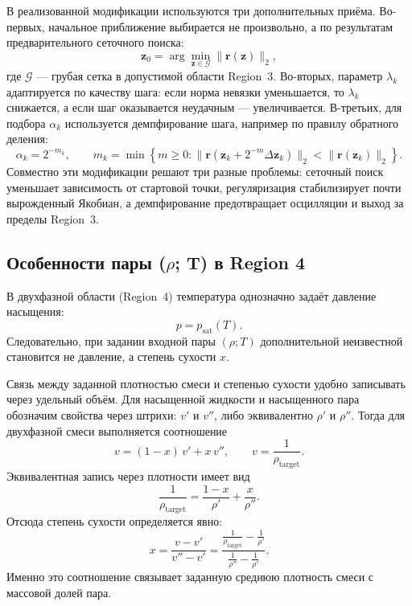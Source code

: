 В реализованной модификации используются три дополнительных приёма.
Во-первых, начальное приближение выбирается
не произвольно,
а по результатам предварительного сеточного поиска:
\begin{equation}
\mathbf{z}_{0} = \arg\min_{\mathbf{z}\in\mathcal{G}}
\|\mathbf{r}(\mathbf{z})\|_{2},
\end{equation}
где $\mathcal{G}$ --- грубая сетка в допустимой области Region~3.
Во-вторых, параметр $\lambda_{k}$ адаптируется по качеству шага:
если норма невязки уменьшается,
то $\lambda_{k}$ снижается,
а если шаг оказывается неудачным ---
увеличивается.
В-третьих, для подбора $\alpha_{k}$
используется демпфирование шага,
например по правилу обратного деления:
\begin{equation}
\alpha_{k} = 2^{-m_{k}},
\qquad
m_{k} = \min\left\{
m \ge 0 :
\|\mathbf{r}(\mathbf{z}_{k} + 2^{-m}\Delta \mathbf{z}_{k})\|_{2}
<
\|\mathbf{r}(\mathbf{z}_{k})\|_{2}
\right\}.
\end{equation}
Совместно эти модификации решают три разные проблемы:
сеточный поиск уменьшает зависимость от стартовой точки,
регуляризация стабилизирует почти вырожденный Якобиан,
а демпфирование предотвращает осцилляции и выход за пределы Region~3.

\subsection{Особенности пары (\texorpdfstring{$\rho$}{rho}; T) в Region 4}

В двухфазной области (Region~4)
температура однозначно задаёт давление насыщения:
\begin{equation}
p = p_{\mathrm{sat}}(T).
\end{equation}
Следовательно, при задании входной пары $(\rho; T)$
дополнительной неизвестной становится не давление,
а степень сухости $x$.

Связь между заданной плотностью смеси
и степенью сухости удобно записывать
через удельный объём.
Для насыщенной жидкости и насыщенного пара
обозначим свойства через штрихи:
$v'$ и $v''$, либо эквивалентно $\rho'$ и $\rho''$.
Тогда для двухфазной смеси выполняется соотношение
\begin{equation}
v = (1-x)\,v' + x\,v'',
\qquad
v = \frac{1}{\rho_{\mathrm{target}}}.
\end{equation}
Эквивалентная запись через плотности имеет вид
\begin{equation}
\frac{1}{\rho_{\mathrm{target}}}
=
\frac{1-x}{\rho'}
+
\frac{x}{\rho''}.
\end{equation}
Отсюда степень сухости определяется явно:
\begin{equation}
x = \frac{v - v'}{v'' - v'}
=
\frac{\frac{1}{\rho_{\mathrm{target}}} - \frac{1}{\rho'}}
{\frac{1}{\rho''} - \frac{1}{\rho'}}.
\end{equation}
Именно это соотношение
связывает заданную среднюю плотность смеси
с массовой долей пара.

